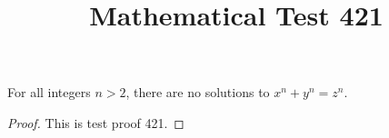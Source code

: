 \documentclass{amsart}
\begin{document}
\title{Mathematical Test 421}
\begin{theorem}
For all integers $n > 2$, there are no solutions to $x^n + y^n = z^n$.
\end{theorem}
\begin{proof}
This is test proof 421.
\end{proof}
\end{document}
